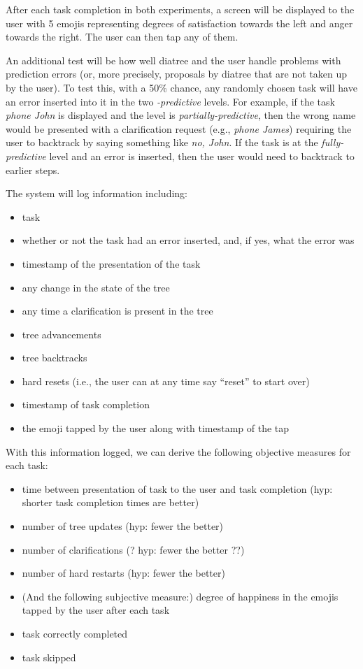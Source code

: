 \documentclass[a4paper,10pt]{article}
\begin{document}
After each task completion in both experiments, a screen will be displayed to the user with 5 emojis representing degrees of satisfaction towards the left and anger towards the right. The user can then tap any of them. 

An additional test will be how well diatree and the user handle problems with prediction errors (or, more precisely, proposals by diatree that are not taken up by the user). To test this, with a 50\% chance, any randomly chosen task will have an error inserted into it in the two \emph{-predictive} levels. For example, if the task \emph{phone John} is displayed and the level is \emph{partially-predictive}, then the wrong name would be presented with a clarification request (e.g., \emph{phone James}) requiring the user to backtrack by saying something like \emph{no, John}. If the task is at the \emph{fully-predictive} level and an error is inserted, then the user would need to backtrack to earlier steps. 

The system will log information including:
\begin{itemize}
 \item task
 \item whether or not the task had an error inserted, and, if yes, what the error was 
 \item timestamp of the presentation of the task
 \item any change in the state of the tree
 \item any time a clarification is present in the tree
 \item tree advancements
 \item tree backtracks
 \item hard resets (i.e., the user can at any time say ``reset'' to start over)
 \item timestamp of task completion
 \item the emoji tapped by the user along with timestamp of the tap
\end{itemize}

With this information logged, we can derive the following objective measures for each task:
\begin{itemize}
 \item time between presentation of task to the user and task completion (hyp: shorter task completion times are better)
 \item number of tree updates (hyp: fewer the better)
 \item number of clarifications (? hyp: fewer the better ??)
 \item number of hard restarts (hyp: fewer the better)
 \item (And the following subjective measure:) degree of happiness in the emojis tapped by the user after each task
 \item task correctly completed
 \item task skipped
\end{itemize}
\end{document}
